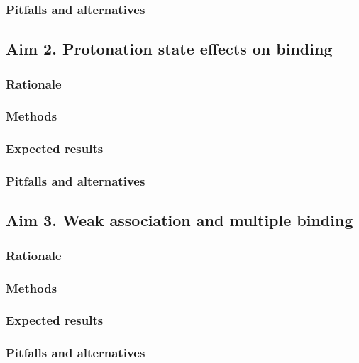 \documentclass[10pt]{article}
\begin{document}
\subsubsection*{Pitfalls and alternatives}
\subsection*{Aim 2. Protonation state effects on binding}
\subsubsection*{Rationale}
\subsubsection*{Methods}
\subsubsection*{Expected results}
\subsubsection*{Pitfalls and alternatives}
\subsection*{Aim 3. Weak association and multiple binding}
\subsubsection*{Rationale}
\subsubsection*{Methods}
\subsubsection*{Expected results}
\subsubsection*{Pitfalls and alternatives}

\printbibliography
	
\end{document}
